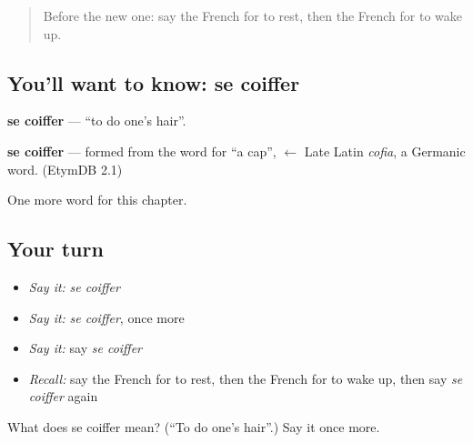 \label{lesson:FR-C235-coiffer}



\begin{quote}
Before the new one: say the French for to rest, then the French for to wake up.
\end{quote}

\subsection*{You'll want to know: se coiffer}
\textbf{se coiffer} — \textquotedblleft{}to do one's hair\textquotedblright{}.

\begin{cousinweb}
\textbf{se coiffer} — formed from the word for \textquotedblleft{}a cap\textquotedblright{}, $\leftarrow$ Late Latin \emph{cofia}, a Germanic word. (EtymDB 2.1)
\end{cousinweb}

\begin{grammarlens}[title={What you've built}]
One more word for this chapter.
\end{grammarlens}

\subsection*{Your turn}
\begin{itemize}
\raggedright
  \item \emph{Say it:} \emph{se coiffer}
  \item \emph{Say it:} \emph{se coiffer}, once more
  \item \emph{Say it:} say \emph{se coiffer}
  \item \emph{Recall:} say the French for to rest, then the French for to wake up, then say \emph{se coiffer} again
\end{itemize}

\begin{tcolorbox}[breakable,colback=teal!4,colframe=teal!35!black,title={Before you move on}]
What does se coiffer mean? (\textquotedblleft{}To do one's hair\textquotedblright{}.) Say it once more.
\end{tcolorbox}
